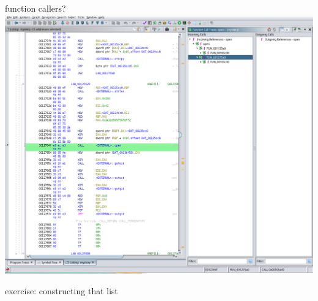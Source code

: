\begin{frame}{function callers?}
\includegraphics[width=\textwidth]{ghidra-symb-refs-ex}
\end{frame}

\begin{frame}{exercise: constructing that list}
\end{frame}
